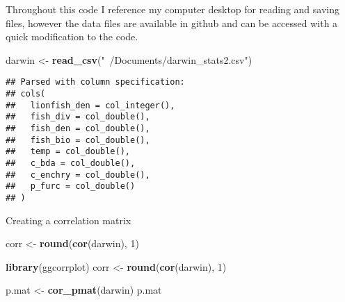 \documentclass[]{article}
\newenvironment{Shaded}{\begin{snugshade}}{\end{snugshade}}
\newcommand{\KeywordTok}[1]{\textcolor[rgb]{0.13,0.29,0.53}{\textbf{#1}}}
\newcommand{\DecValTok}[1]{\textcolor[rgb]{0.00,0.00,0.81}{#1}}
\newcommand{\StringTok}[1]{\textcolor[rgb]{0.31,0.60,0.02}{#1}}
\newcommand{\NormalTok}[1]{#1}
\begin{document}
Throughout this code I reference my computer desktop for reading and
saving files, however the data files are available in github and can be
accessed with a quick modification to the code.

\begin{Shaded}
\begin{Highlighting}[]
\NormalTok{darwin <-}\StringTok{ }\KeywordTok{read_csv}\NormalTok{(}\StringTok{"~/Documents/darwin_stats2.csv"}\NormalTok{)}
\end{Highlighting}
\end{Shaded}

\begin{verbatim}
## Parsed with column specification:
## cols(
##   lionfish_den = col_integer(),
##   fish_div = col_double(),
##   fish_den = col_double(),
##   fish_bio = col_double(),
##   temp = col_double(),
##   c_bda = col_double(),
##   c_enchry = col_double(),
##   p_furc = col_double()
## )
\end{verbatim}

Creating a correlation matrix

\begin{Shaded}
\begin{Highlighting}[]
\NormalTok{corr <-}\StringTok{ }\KeywordTok{round}\NormalTok{(}\KeywordTok{cor}\NormalTok{(darwin), }\DecValTok{1}\NormalTok{)}
\end{Highlighting}
\end{Shaded}

\begin{Shaded}
\begin{Highlighting}[]
\KeywordTok{library}\NormalTok{(ggcorrplot)}
\NormalTok{corr <-}\StringTok{ }\KeywordTok{round}\NormalTok{(}\KeywordTok{cor}\NormalTok{(darwin), }\DecValTok{1}\NormalTok{)}
\end{Highlighting}
\end{Shaded}

\begin{Shaded}
\begin{Highlighting}[]
\NormalTok{p.mat <-}\StringTok{ }\KeywordTok{cor_pmat}\NormalTok{(darwin)}
\NormalTok{p.mat}
\end{Highlighting}
\end{Shaded}
\end{document}
